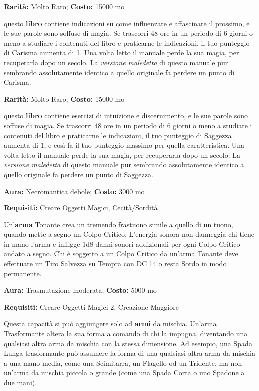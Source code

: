 \begin{multicols}{2}

\textbf{Rarità:} Molto Raro; \textbf{Costo:} 15000 mo

questo \textbf{libro} contiene indicazioni su come influenzare e affascinare il prossimo, e le sue parole sono soffuse di magia. Se trascorri 48 ore in un periodo di 6 giorni o meno a studiare i contenuti del libro e praticarne le indicazioni, il tuo punteggio di Carisma aumenta di 1. Una volta letto il manuale perde la sua magia, per recuperarla dopo un secolo. La \emph{versione maledetta} di questo manuale pur sembrando assolutamente identico a quello originale fa perdere un punto di Carisma.


\textbf{Rarità:} Molto Raro; \textbf{Costo:} 15000 mo

questo \textbf{libro} contiene esercizi di intuizione e discernimento, e le sue parole sono soffuse di magia. Se trascorri 48 ore in un periodo di 6 giorni o meno a studiare i contenuti del libro e praticarne le indicazioni, il tuo punteggio di Saggezza aumenta di 1, e così fa il tuo punteggio massimo per quella caratteristica. Una volta letto il manuale perde la sua magia, per recuperarla dopo un secolo. La \emph{versione maledetta} di questo manuale pur sembrando assolutamente identico a quello originale fa perdere un punto di Saggezza.


\textbf{Aura:} Necromantica debole; \textbf{Costo:} 3000 mo

\textbf{Requisiti:} Creare Oggetti Magici, Cecità/Sordità

Un'\textbf{arma} Tonante crea un tremendo frastuono simile a quello di un tuono, quando mette a segno un Colpo Critico. L'energia sonora non danneggia chi tiene in mano l'arma e infligge 1d8 danni sonori addizionali per ogni Colpo Critico andato a segno. Chi è soggetto a un Colpo Critico da un'arma Tonante deve effettuare un Tiro Salvezza su Tempra con DC 14 o resta Sordo in modo permanente.


\textbf{Aura:} Trasmutazione moderata; \textbf{Costo:} 5000 mo

\textbf{Requisiti:} Creare Oggetti Magici 2, Creazione Maggiore

Questa capacità si può aggiungere solo ad \textbf{armi} da mischia. Un'arma Trasformante altera la sua forma a comando di chi la impugna, diventando una qualsiasi altra arma da mischia con la stessa dimensione. Ad esempio, una Spada Lunga trasformante può assumere la forma di una qualsiasi altra arma da mischia a una mano media, come una Scimitarra, un Flagello od un Tridente, ma non un'arma da mischia piccola o grande (come una Spada Corta o uno Spadone a due mani).


\end{multicols}
